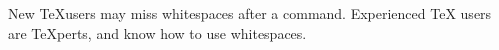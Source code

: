 New \TeX users may miss whitespaces
after a command. %
Experienced \TeX{} users are
\TeX perts, and know how to use
whitespaces. %